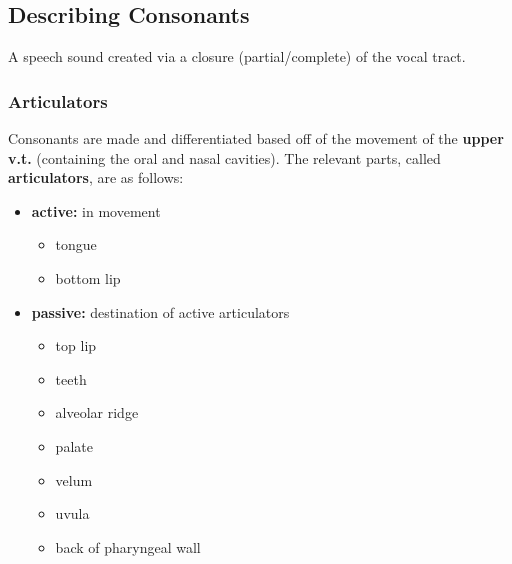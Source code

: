 \documentclass[12pt]{article}
\begin{document}
\subsection{Describing Consonants}

\begin{definitionEnd}[Consonant]
  A speech sound created via a closure (partial/complete) of the vocal tract.
\end{definitionEnd}

\subsubsection{Articulators}
Consonants are made and differentiated based off of the movement of the \textbf{upper v.t.} (containing the oral and nasal cavities). The relevant parts, called \textbf{articulators}, are as follows:

\begin{itemize}
  \item \textbf{active:} in movement \begin{itemize}
    \item tongue
    \item bottom lip
  \end{itemize}
  \item \textbf{passive:} destination of active articulators \begin{itemize}
  \item top lip
  \item teeth
  \item alveolar ridge
  \item palate
  \item velum
  \item uvula
  \item back of pharyngeal wall
  \end{itemize}
\end{itemize}
\end{document}
